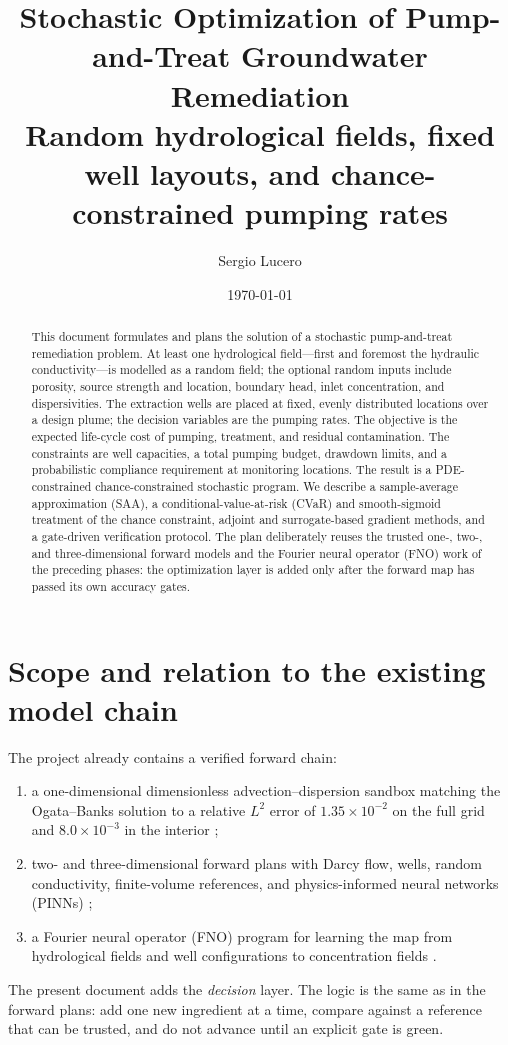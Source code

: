 \documentclass[11pt]{article}
\title{Stochastic Optimization of Pump-and-Treat Groundwater Remediation\\[2pt]
\large Random hydrological fields, fixed well layouts, and
chance-constrained pumping rates}
\author{Sergio Lucero}
\date{\today}
\numberwithin{equation}{section}
\theoremstyle{plain}
\begin{document}
\maketitle

\begin{abstract}
This document formulates and plans the solution of a stochastic
pump-and-treat remediation problem.  At least one hydrological field---first
and foremost the hydraulic conductivity---is modelled as a random field; the
optional random inputs include porosity, source strength and location,
boundary head, inlet concentration, and dispersivities.  The extraction wells
are placed at fixed, evenly distributed locations over a design plume; the
decision variables are the pumping rates.  The objective is the expected
life-cycle cost of pumping, treatment, and residual contamination.  The
constraints are well capacities, a total pumping budget, drawdown limits, and a
probabilistic compliance requirement at monitoring locations.  The result is a
PDE-constrained chance-constrained stochastic program.  We describe a
sample-average approximation (SAA), a conditional-value-at-risk (CVaR) and
smooth-sigmoid treatment of the chance constraint, adjoint and
surrogate-based gradient methods, and a gate-driven verification protocol.
The plan deliberately reuses the trusted one-, two-, and three-dimensional
forward models and the Fourier neural operator (FNO) work of the preceding
phases: the optimization layer is added only after the forward map has passed
its own accuracy gates.
\end{abstract}

\tableofcontents

\section{Scope and relation to the existing model chain}
\label{sec:scope}

The project already contains a verified forward chain:
\begin{enumerate}[leftmargin=1.6em,itemsep=2pt]
  \item a one-dimensional dimensionless advection--dispersion sandbox
        matching the Ogata--Banks solution to a relative $L^2$ error of
        $1.35\times10^{-2}$ on the full grid and $8.0\times10^{-3}$ in the
        interior \citep{ogata1961solution};
  \item two- and three-dimensional forward plans with Darcy flow, wells,
        random conductivity, finite-volume references, and
        physics-informed neural networks (PINNs)
        \citep{raissi2019pinn};
  \item a Fourier neural operator (FNO) program for learning the map from
        hydrological fields and well configurations to concentration fields
        \citep{li2021fno,kovachki2023neural}.
\end{enumerate}
The present document adds the \emph{decision} layer.  The logic is the same as
in the forward plans: add one new ingredient at a time, compare against a
reference that can be trusted, and do not advance until an explicit gate is
green.
\end{document}
